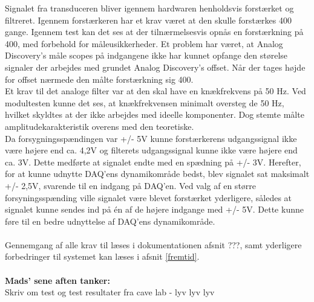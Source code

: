 Signalet fra transduceren bliver igennem hardwaren henholdsvis forstærket og filtreret. Igennem forstærkeren har et krav været at den skulle forstærkes 400 gange. Igennem test kan det ses at der tilnærmelsesvis opnås en forstærkning på 400, med forbehold for måleusikkerheder. Et problem har været, at Analog Discovery’s måle scopes på indgangene ikke har kunnet opfange den størelse signaler der arbejdes med grundet Analog Discovery’s offset. Når der tages højde for offset nærmede den målte forstærkning sig 400. \\
Et krav til det analoge filter var at den skal have en knækfrekvens på 50 Hz. Ved modultesten kunne det ses, at knækfrekvensen minimalt oversteg de 50 Hz, hvilket skyldtes at der ikke arbejdes med ideelle komponenter. Dog stemte målte amplitudekarakteristik overens med den teoretiske. \\
Da forsygningsspændingen var +/- 5V kunne forstærkerens udgangssignal ikke være højere end ca. 4,2V og filterets udgangssignal kunne ikke være højere end ca. 3V. Dette medførte at signalet endte med en spædning på +/- 3V. Herefter, for at kunne udnytte DAQ’ens dynamikområde bedst, blev signalet sat maksimalt +/- 2,5V, svarende til en indgang på DAQ’en. Ved valg af en større forsyningsspænding ville signalet være blevet forstærket yderligere, således at signalet kunne sendes ind på én af de højere indgange med +/- 5V. Dette kunne føre til en bedre udnyttelse af DAQ'ens dynamikområde.\\
\\
Gennemgang af alle krav til læses i dokumentationen afsnit ???, samt yderligere forbedringer til systemet kan læses i afsnit \ref{fremtid}.\\
\\
\textbf{Mads' sene aften tanker:}\\
Skriv om test og test resultater fra cave lab - lyv lyv lyv


